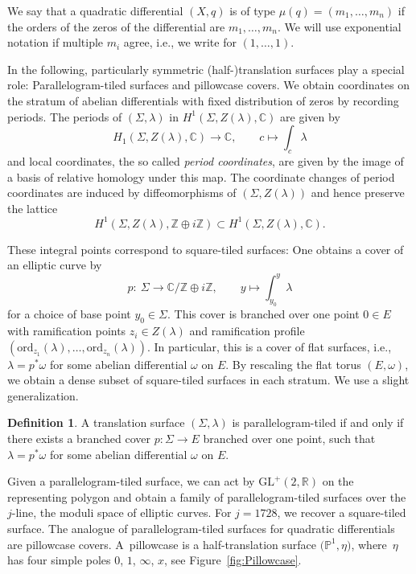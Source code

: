 \documentclass[10pt,a4paper]{amsart}
\numberwithin{equation}{section}
\theoremstyle{definition}
\newtheorem{defi}[theo]{Definition}
\newcommand{\ord}{\mathrm{ord}}
\renewcommand{\to}{\rightarrow}
\newcommand{\ZZ}{\mathbb{Z}}
\newcommand{\RR}{\mathbb{R}}
\newcommand{\CC}{\mathbb{C}}
\newcommand{\PP}{\mathbb{P}}
\newcommand{\GL}{\mathrm{GL}}
\begin{document}
We say that a quadratic differential $(X,q)$ is of type $\mu(q) = (m_1,\dots,m_n)$ if the orders of the zeros of the differential are $m_1,\dots,m_n$.
We will use exponential notation if multiple $m_i$ agree, i.e., we write  for $(1, \dots, 1)$.

In the following, particularly symmetric (half-)translation surfaces play a special role: Para\-llelo\-gram-tiled surfaces and pillowcase covers. We obtain coordinates on the stratum of abelian differentials with fixed distribution of zeros by recording periods. The periods of $(\Sigma,\lambda)$ in $H^1(\Sigma,Z(\lambda),\CC)$ are given by
\[ H_1(\Sigma, Z(\lambda),\CC) \to \CC, \qquad c \mapsto \int_c \lambda
\]
and local coordinates, the so called \emph{period coordinates}, are given by the image of a basis of relative homology under this map.
The coordinate changes of period coordinates are induced by diffeomorphisms of $(\Sigma,Z(\lambda))$ and hence preserve the lattice
\[ H^1(\Sigma, Z(\lambda), \ZZ \oplus i \ZZ) \subset H^1(\Sigma,Z(\lambda),\CC).
\]

These integral points correspond to square-tiled surfaces: One obtains a cover of an elliptic curve by
\[ p\colon \ \Sigma \to \CC /\ZZ \oplus i\ZZ, \qquad y \mapsto \int_{y_0}^y \lambda
\]
for a choice of base point $y_0 \in \Sigma$. This cover is branched over one point $0 \in E$ with ramification points $z_i \in Z(\lambda)$ and ramification profile $(\ord_{z_1}(\lambda),\dots,\ord_{z_n}(\lambda))$. In particular, this is a cover of flat surfaces, i.e., $\lambda=p^*\omega$ for some abelian differential $\omega$ on $E$. By rescaling the flat torus $(E,\omega)$, we obtain a dense subset of square-tiled surfaces in each stratum. We use a slight generalization.

\begin{defi} A translation surface $(\Sigma, \lambda)$ is parallelogram-tiled if and only if there exists a branched cover $p\colon \Sigma \to E$ branched over one point, such that $\lambda=p^*\omega$ for some abelian differential $\omega$ on $E$.
\end{defi}

Given a parallelogram-tiled surface, we can act by $\GL^+(2,\RR)$ on the representing polygon and obtain a family of parallelogram-tiled surfaces over the $j$-line, the moduli space of elliptic curves. For $j=1728$, we recover a square-tiled surface. The analogue of parallelogram-tiled surfaces for quadratic differentials are pillowcase covers. A~pillowcase is a half-translation surface $\bigl(\PP^1,\eta\bigr)$, where~$\eta$ has four simple poles $0$, $1$, $\infty$, $x$, see Figure~\ref{fig:Pillowcase}.
\end{document}
